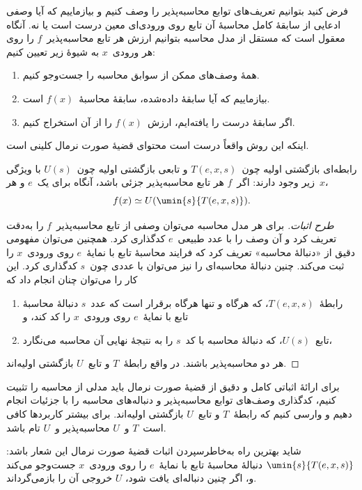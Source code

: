 \documentclass[../../../include/open-logic-section]{subfiles}
\begin{document}

فرض کنید بتوانیم تعریف‌های توابع محاسبه‌پذیر را وصف کنیم و بیازماییم
که آیا وصفی ادعایی از سابقهٔ کامل محاسبهٔ آن تابع روی ورودی‌ای معین
درست است یا نه. آنگاه معقول است که مستقل از مدل محاسبه بتوانیم ارزش هر
تابع محاسبه‌پذیر~$f$ را روی هر ورودی~$x$ به شیوهٔ زیر تعیین کنیم:
\begin{enumerate}
  \item همهٔ وصف‌های ممکن از سوابق محاسبه را جست‌وجو کنیم.
  \item بیازماییم که آیا سابقهٔ داده‌شده، سابقهٔ محاسبهٔ~$f(x)$ است.
  \item اگر سابقهٔ درست را یافته‌ایم، ارزش~$f(x)$ را از آن استخراج
  کنیم.
\end{enumerate}
اینکه این روش واقعاً درست است محتوای قضیهٔ صورت نرمال کلینی است.

\begin{thm}
رابطه‌ای بازگشتی اولیه چون~$T(e,x,s)$ و تابعی بازگشتی اولیه چون~$U(s)$
با ویژگی زیر وجود دارند: اگر~$f$ هر تابع محاسبه‌پذیر جزئی باشد، آنگاه
برای یک~$e$ و هر~$x$،
\[
f(x) \simeq U(\umin{s}{T(e, x, s)}).
\]
\end{thm}

\begin{proof}[طرح اثبات]
برای هر مدل محاسبه می‌توان وصفی از تابع محاسبه‌پذیر~$f$ را به‌دقت
تعریف کرد و آن وصف را با عدد طبیعی~$e$ کدگذاری کرد. همچنین می‌توان
مفهومی دقیق از «دنبالهٔ محاسبه» تعریف کرد که فرایند محاسبهٔ تابع با
نمایهٔ~$e$ روی ورودی~$x$ را ثبت می‌کند. چنین دنبالهٔ محاسبه‌ای را نیز
می‌توان با عددی چون~$s$ کدگذاری کرد. این کار را می‌توان چنان انجام داد
که
\begin{enumerate}
  \item رابطهٔ~$T(e,x,s)$، که هرگاه و تنها هرگاه برقرار است که عدد~$s$
  دنبالهٔ محاسبهٔ تابع با نمایهٔ~$e$ روی ورودی~$x$ را کد کند، و
  \item تابع~$U(s)$، که دنبالهٔ محاسبه با کد~$s$ را به نتیجهٔ نهایی
  آن محاسبه می‌نگارد،
\end{enumerate}
هر دو محاسبه‌پذیر باشند. در واقع رابطهٔ~$T$ و تابع~$U$ بازگشتی
اولیه‌اند.
\end{proof}

\begin{explain}
برای ارائهٔ اثباتی کامل و دقیق از قضیهٔ صورت نرمال باید مدلی از محاسبه
را تثبیت کنیم، کدگذاری وصف‌های توابع محاسبه‌پذیر و دنباله‌های محاسبه را
با جزئیات انجام دهیم و وارسی کنیم که رابطهٔ~$T$ و تابع~$U$ بازگشتی
اولیه‌اند. برای بیشتر کاربردها کافی است~$T$ و~$U$ محاسبه‌پذیر و~$U$
تام باشد.

شاید بهترین راه به‌خاطرسپردن اثبات قضیهٔ صورت نرمال این شعار باشد:
$\umin{s}{T(e,x,s)}$ دنبالهٔ محاسبهٔ تابع با نمایهٔ~$e$ را روی
ورودی~$x$ جست‌وجو می‌کند و، اگر چنین دنباله‌ای یافت شود، $U$ خروجی آن
را بازمی‌گرداند.
\end{explain}
\end{document}
